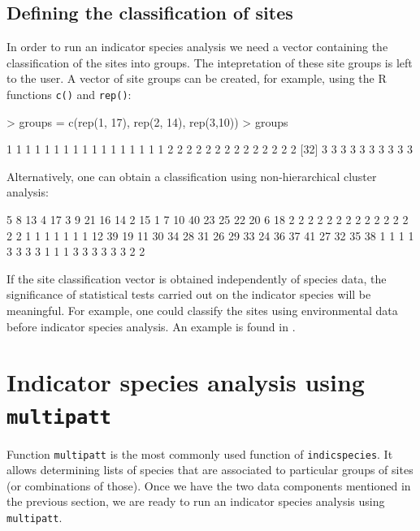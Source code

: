 \documentclass[11pt,a4paper]{article}
\begin{document}
\subsection{Defining the classification of sites}
In order to run an indicator species analysis we need a vector containing the classification of the sites into groups. The intepretation of these site groups is left to the user. A vector of site groups can be created, for example, using the R functions \texttt{c()} and \texttt{rep()}:
\begin{Schunk}
\begin{Sinput}
> groups = c(rep(1, 17), rep(2, 14), rep(3,10))
> groups
\end{Sinput}
\begin{Soutput}
 [1] 1 1 1 1 1 1 1 1 1 1 1 1 1 1 1 1 1 2 2 2 2 2 2 2 2 2 2 2 2 2 2
[32] 3 3 3 3 3 3 3 3 3 3
\end{Soutput}
\end{Schunk}
Alternatively, one can obtain a classification using non-hierarchical cluster analysis:
\begin{Schunk}
\begin{Soutput}
 5  8 13  4 17  3  9 21 16 14  2 15  1  7 10 40 23 25 22 20  6 18 
 2  2  2  2  2  2  2  2  2  2  2  2  2  2  2  1  1  1  1  1  1  1 
12 39 19 11 30 34 28 31 26 29 33 24 36 37 41 27 32 35 38 
 1  1  1  1  3  3  3  3  1  1  1  3  3  3  3  3  3  2  2 
\end{Soutput}
\end{Schunk}

If the site classification vector is obtained independently of species data, the significance of statistical tests carried out on the indicator species will be meaningful. For example, one could classify the sites using environmental data before indicator species analysis. An example is found in \citet{Borcard2011}.

\section{Indicator species analysis using \texttt{multipatt}}
Function \texttt{multipatt} is the most commonly used function of \texttt{indicspecies}. It allows determining lists of species that are associated to particular groups of sites (or combinations of those). Once we have the two data components mentioned in the previous section, we are ready to run an indicator species analysis using \texttt{multipatt}.
\end{document}
